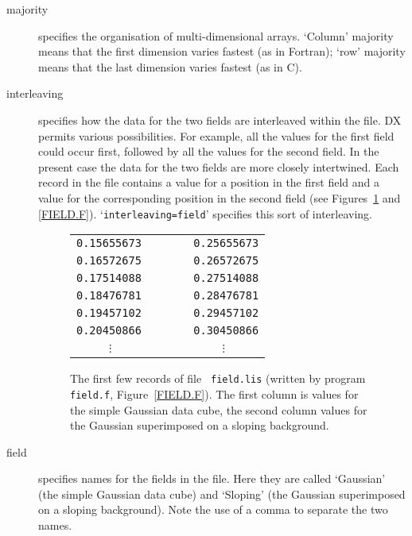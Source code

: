 \begin{enumerate}
\begin{description}
    \item[majority] specifies the organisation of multi-dimensional
     arrays. `Column' majority means that the first dimension varies
     fastest (as in Fortran); `row' majority means that the last
     dimension varies fastest (as in C).

    \item[interleaving] specifies how the data for the two fields are
     interleaved within the file. DX permits various possibilities.
     For example, all the values for the first field could occur
     first, followed by all the values for the second field. In the
     present case the data for the two fields are more closely
     intertwined. Each record in the file contains a value for a
     position in the first field and a value for the corresponding
     position in the second field (see Figures~\ref{GRID_DATA} and
     \ref{FIELD.F}). `{\tt interleaving=field}' specifies this
     sort of interleaving.

    \begin{figure}[htbp]

    \begin{center}
    \begin{tabular}{l}
     {\tt 0.15655673~~~~~~~~0.25655673} \\
     {\tt 0.16572675~~~~~~~~0.26572675}  \\
     {\tt 0.17514088~~~~~~~~0.27514088}  \\
     {\tt 0.18476781~~~~~~~~0.28476781}  \\
     {\tt 0.19457102~~~~~~~~0.29457102}  \\
     {\tt 0.20450866~~~~~~~~0.30450866}  \\
     {\tt ~~~~~$\vdots$~~~~~~~~~~~~~~~~~$\vdots$}  \\
    \end{tabular}
    \end{center}

    \begin{quote}
    \caption[File {\tt field.lis}.]{The first few records of file {\tt
     field.lis} (written by program {\tt field.f},
     Figure~\ref{FIELD.F}). The first column is values for the simple
     Gaussian data cube, the second column values for the Gaussian
     superimposed on a sloping background. \label{GRID_DATA} }
    \end{quote}

    \end{figure}

    \item[field] specifies names for the fields in the file. Here
     they are called `Gaussian' (the simple Gaussian data cube) and
     `Sloping' (the Gaussian superimposed on a sloping background).
     Note the use of a comma to separate the two names.


\end{description}
\end{enumerate}
